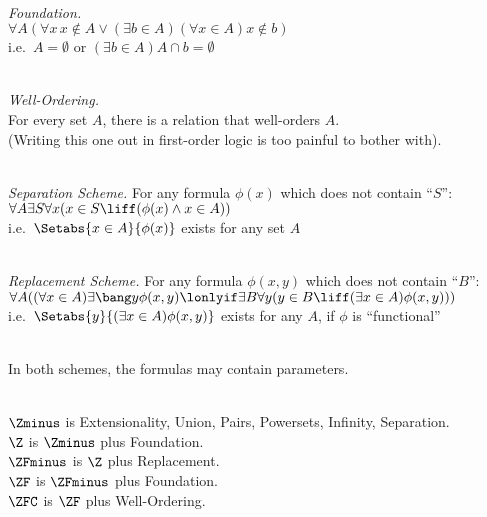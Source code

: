 \documentclass[../../../include/open-logic-chapter]{subfiles}
\begin{document}
\
\\\emph{Foundation.}
\\$\forall A(\forall x\, x \notin A \lor (\exists b \in A)(\forall x \in A)x \notin b)$
\\i.e.\ $A = \emptyset$ or $(\exists b \in A)A\cap b = \emptyset$

\
\\\emph{Well-Ordering.} 
\\For every set $A$, there is a relation that well-orders $A$.
\\(Writing this one out in first-order logic is too painful to bother with).

\
\\\emph{Separation Scheme.} For any formula $\phi(x)$ which does not contain ``$S$'':
\\$\forall A \exists S \forall x(x \in S \liff (\phi(x) \land x \in A))$
\\i.e.\ $\Setabs{x \in A}{\phi(x)}$ exists for any set $A$

\
\\\emph{Replacement Scheme.} For any formula $\phi(x, y)$ which does not contain ``$B$'':
\\$\forall A((\forall x \in A)\exists \bang y \phi(x,y) \lonlyif \exists B \forall y (y \in B \liff (\exists x \in A)\phi(x,y)))$
\\i.e.\ $\Setabs{y}{(\exists x \in A)\phi(x,y)}$ exists for any $A$, if $\phi$ is ``functional''

\
\\In both schemes, the formulas may contain parameters. 

\
\\$\Zminus$ is Extensionality, Union, Pairs, Powersets, Infinity, Separation.
\\$\Z$ is $\Zminus$ plus Foundation.
\\$\ZFminus$ is $\Z$ plus Replacement.
\\$\ZF$ is $\ZFminus$ plus Foundation.
\\$\ZFC$ is $\ZF$ plus Well-Ordering.
\end{document}
